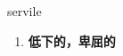 
\begin{frame}
{\huge servile}
\begin{center}
\begin{enumerate}\Large
  \item \textbf{低下的，卑屈的}
\end{enumerate}
\end{center}
\end{frame}
